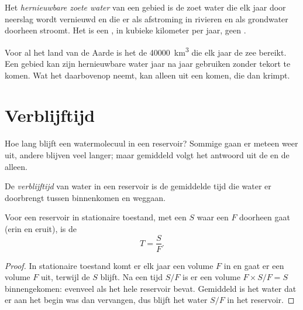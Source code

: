 \begin{definition}\label{def:g10:freshwater-resources:renewable}
Het \emph{hernieuwbare zoete water} van een gebied
is de  zoet water die elk jaar door neerslag wordt vernieuwd en die er als
afstroming in rivieren en als grondwater doorheen stroomt. Het is een , in
kubieke kilometer per jaar, geen .
\end{definition}

Voor al het land van de Aarde is het de \num{40000}~\unit{km^3} die elk jaar de
zee bereikt. Een gebied kan zijn hernieuwbare water jaar na jaar gebruiken zonder
tekort te komen. Wat het daarbovenop neemt, kan alleen uit een  komen,
die dan krimpt.

\section{Verblijftijd}

Hoe lang blijft een watermolecuul in een reservoir? Sommige gaan er meteen weer
uit, andere blijven veel langer; maar gemiddeld volgt het antwoord uit de
 en de  alleen.

\begin{definition}[Verblijftijd]\label{def:g10:freshwater-resources:residence-time}
De \emph{verblijftijd} van water in een reservoir is de
gemiddelde tijd die water er doorbrengt tussen binnenkomen en weggaan.
\end{definition}

\begin{proposition}\label{prop:g10:freshwater-resources:residence}
Voor een reservoir in stationaire toestand, met een  $S$ waar een  $F$
doorheen gaat (erin en eruit), is de 
\[
T = \frac{S}{F}.
\]
\end{proposition}

\begin{proof}
In stationaire toestand komt er elk jaar een volume $F$ in en gaat er een volume
$F$ uit, terwijl de  $S$ blijft. Na een tijd $S/F$ is er een volume
$F \times S/F = S$ binnengekomen: evenveel als het hele reservoir bevat.
Gemiddeld is het water dat er aan het begin was dan vervangen, dus blijft het
water $S/F$ in het reservoir.
\end{proof}

